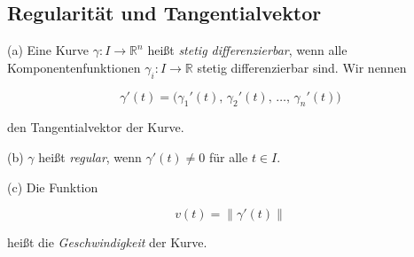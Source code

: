 \subsection{Regularität und Tangentialvektor}

\begin{definition}{}
(a) Eine Kurve $\gamma : I \to \mathbb{R}^n$ heißt \emph{stetig differenzierbar}, wenn alle Komponentenfunktionen $\gamma_i : I \to \mathbb{R}$ stetig differenzierbar sind. Wir nennen


\[
\gamma'(t) = \bigl( \gamma_1'(t),\, \gamma_2'(t),\, \dots,\, \gamma_n'(t) \bigr)
\]


den Tangentialvektor der Kurve.

(b) $\gamma$ heißt \emph{regular}, wenn $\gamma'(t) \neq 0$ für alle $t \in I$.

(c) Die Funktion 


\[
v(t) = \|\gamma'(t)\|
\]


heißt die \emph{Geschwindigkeit} der Kurve.
\end{definition}

